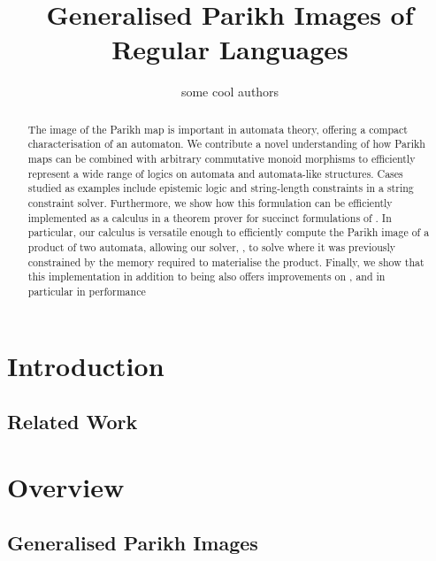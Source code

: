 \documentclass[runningheads]{llncs}
\title{Generalised Parikh Images of Regular Languages}
\author{some cool authors}
\institute{Uppsala University, Sweden}
\newif\ifoutline
\newcommand{\contents}[1]{\ifoutline{\color{blue}
    \begin{itemize}
    #1
    \end{itemize}
  }\fi}
\begin{document}
\maketitle

\begin{abstract}
  The image of the Parikh map is important in automata theory, offering a compact characterisation of an automaton. We contribute a novel understanding of how Parikh maps can be combined with arbitrary commutative monoid morphisms to efficiently represent a wide range of logics on automata and automata-like structures. Cases studied as examples include epistemic logic and string-length constraints in a string constraint solver. Furthermore, we show how this formulation can be efficiently implemented as a calculus in a theorem prover for succinct formulations of . In particular, our calculus is versatile enough to efficiently compute the Parikh image of a product of two automata, allowing our solver, \Ostrich{}, to solve  where it was previously constrained by the memory required to materialise the product. Finally, we show that this implementation in addition to being  also offers  improvements on , and in particular  in performance 
\end{abstract}

\section{Introduction}

\contents{
\item key challenges: (1) complicated QE problem that was part of
  previous definitions; (2) languages with large alphabets described
  by symbolic automata; (3) regular languages described by products
  of automata
}

\subsection{Related Work}


\section{Overview}

\subsection{Generalised Parikh Images}\label{sec:generalised}
\end{document}
